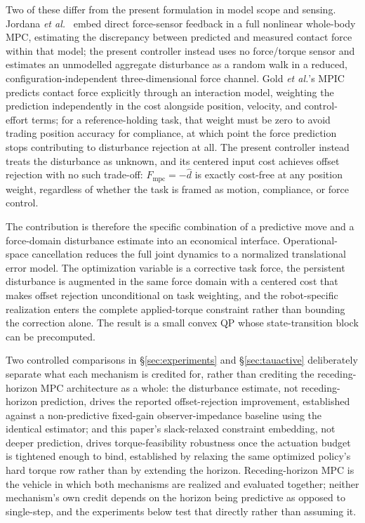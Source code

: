 \documentclass[journal]{IEEEtran}
\newcommand{\Fmpc}{F_{\text{mpc}}}
\newcommand{\dhat}{\hat{d}}
\begin{document}
Two of these differ from the present formulation in model scope and sensing.
Jordana \emph{et al.}~\cite{jordana2024force} embed direct force-sensor
feedback in a full nonlinear whole-body MPC, estimating the discrepancy
between predicted and measured contact force within that model; the present
controller instead uses no force/torque sensor and estimates an unmodelled
aggregate disturbance as a random walk in a reduced, configuration-independent
three-dimensional force channel. Gold \emph{et al.}'s MPIC~\cite{gold2023mpic}
predicts contact force explicitly through an interaction model, weighting the
prediction independently in the cost alongside position, velocity, and
control-effort terms; for a reference-holding task, that weight must be zero
to avoid trading position accuracy for compliance, at which point the force
prediction stops contributing to disturbance rejection at all. The present
controller instead treats the disturbance as unknown, and its centered input
cost achieves offset rejection with no such trade-off: $\Fmpc=-\dhat$ is
exactly cost-free at any position weight, regardless of whether the task is
framed as motion, compliance, or force control.

The contribution is therefore the specific combination of a predictive
move and a force-domain disturbance estimate into an economical
interface.  Operational-space cancellation reduces the full joint
dynamics to a normalized translational error model.  The optimization variable is a corrective task
force, the persistent disturbance is augmented in the same force domain with
a centered cost that makes offset rejection unconditional on task weighting,
and the robot-specific realization enters the complete applied-torque
constraint rather than bounding the correction alone.  The result is a small
convex QP whose state-transition block can be precomputed.

Two controlled comparisons in \S\ref{sec:experiments} and
\S\ref{sec:tauactive} deliberately separate what each mechanism is
credited for, rather than crediting the receding-horizon MPC architecture
as a whole: the disturbance estimate, not receding-horizon prediction,
drives the reported offset-rejection improvement, established against a
non-predictive fixed-gain observer-impedance baseline using the identical
estimator; and this paper's slack-relaxed constraint embedding, not
deeper prediction, drives torque-feasibility robustness once the
actuation budget is tightened enough to bind, established by relaxing the
same optimized policy's hard torque row rather than by extending the
horizon. Receding-horizon MPC is the vehicle in which both mechanisms are
realized and evaluated together; neither mechanism's own credit depends
on the horizon being predictive as opposed to single-step, and the
experiments below test that directly rather than assuming it.
\end{document}

